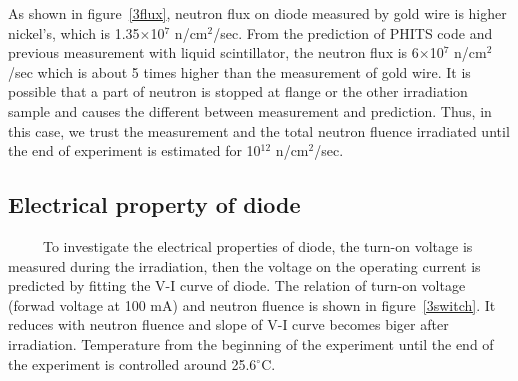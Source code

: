 As shown in figure~\ref{3flux}, neutron flux on diode measured by gold wire is higher nickel's, which is 1.35$\times$10$^7$ n/cm$^2$/sec.
From the prediction of PHITS code and previous measurement with liquid scintillator, the neutron flux is 6$\times$10$^7$ n/cm$^2$/sec which is about 5 times higher than the measurement of gold wire.
It is possible that a part of neutron is stopped at flange or the other irradiation sample and causes the different between measurement and prediction.
Thus, in this case, we trust the measurement and the total neutron fluence irradiated until the end of experiment is estimated for 10$^{12}$ n/cm$^2$/sec.

  \subsection{Electrical property of diode}
~~~~~To investigate the electrical properties of diode, the turn-on voltage is measured during the irradiation, then the voltage on the operating current is predicted by fitting the V-I curve of diode.
The relation of turn-on voltage (forwad voltage at 100 mA) and neutron fluence is shown in figure~\ref{3switch}.
It reduces with neutron fluence and slope of V-I curve becomes biger after irradiation.
Temperature from the beginning of the experiment until the end of the experiment is controlled around 25.6$^{\circ}$C.

